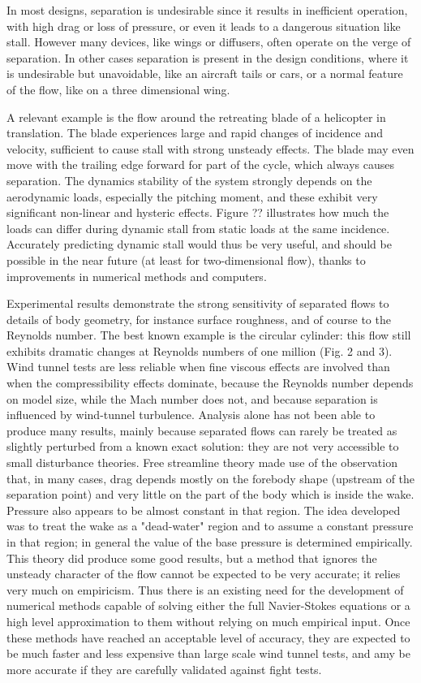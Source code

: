 In most designs, separation is undesirable since it results in inefficient operation, with high drag or loss of pressure, or even it leads to a dangerous situation like stall.
However many devices, like wings or diffusers, often operate on the verge of separation.
In other cases separation is present in the design conditions, where it is undesirable but unavoidable, like an aircraft tails or cars, or a normal feature of the flow, like on a three dimensional wing.

A relevant example is the flow around the retreating blade of a helicopter in translation.
The blade experiences large and rapid changes of incidence and velocity, sufficient to cause stall with strong unsteady effects.
The blade may even move with the trailing edge forward for part of the cycle, which always causes separation.
The dynamics stability of the system strongly depends on the aerodynamic loads, especially the pitching moment, and these exhibit very significant non-linear and hysteric effects.
Figure ?? illustrates how much the loads can differ during dynamic stall from static loads at the same incidence.
Accurately predicting dynamic stall would thus be very useful, and should be possible in the near future (at least for two-dimensional flow), thanks to improvements in numerical methods and computers.

Experimental results demonstrate the strong sensitivity of separated flows to details of body geometry, for instance surface roughness, and of course to the Reynolds number.
The best known example is the circular cylinder: this flow still exhibits dramatic changes at Reynolds numbers of one million (Fig. 2 and 3).
Wind tunnel tests are less reliable when fine viscous effects are involved than when the compressibility effects dominate, because the Reynolds number depends on model size, while the Mach number does not, and because separation is influenced by wind-tunnel turbulence.
Analysis alone has not been able to produce many results, mainly because separated flows can rarely be treated as slightly perturbed from a known exact solution: they are not very accessible to small disturbance theories.
Free streamline theory made use of the observation that, in many cases, drag depends mostly on the forebody shape (upstream of the separation point) and very little on the part of the body which is inside the wake.
Pressure also appears to be almost constant in that region.
The idea developed was to treat the wake as a "dead-water" region and to assume a constant pressure in that region; in general the value of the base pressure is determined empirically.
This theory did produce some good results, but a method that ignores the unsteady character of the flow cannot be expected to be very accurate; it relies very much on empiricism.
Thus there is an existing need for the development of numerical methods capable of solving either the full Navier-Stokes equations or a high level approximation to them without relying on much empirical input.
Once these methods have reached an acceptable level of accuracy, they are expected to be much faster and less expensive than large scale wind tunnel tests, and amy be more accurate if they are carefully validated against fight tests.

